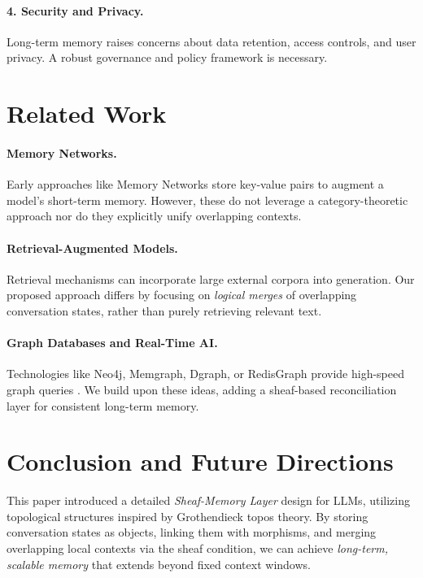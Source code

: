 \documentclass{article}
\begin{document}
\paragraph{4. Security and Privacy.}
Long-term memory raises concerns about data retention, access controls, and user privacy. A robust governance and policy framework is necessary.

\section{Related Work}
\label{sec:related_work}

\paragraph{Memory Networks.}
Early approaches like Memory Networks \citep{weston2014memory, sukhbaatar2015end} store key-value pairs to augment a model’s short-term memory. However, these do not leverage a category-theoretic approach nor do they explicitly unify overlapping contexts.

\paragraph{Retrieval-Augmented Models.}
Retrieval mechanisms \citep{lewis2020retrieval, izacard2022few} can incorporate large external corpora into generation. Our proposed approach differs by focusing on \emph{logical merges} of overlapping conversation states, rather than purely retrieving relevant text.

\paragraph{Graph Databases and Real-Time AI.}
Technologies like Neo4j, Memgraph, Dgraph, or RedisGraph provide high-speed graph queries \citep{lin2020towards}. We build upon these ideas, adding a sheaf-based reconciliation layer for consistent long-term memory.

\section{Conclusion and Future Directions}

This paper introduced a detailed \emph{Sheaf-Memory Layer} design for LLMs, utilizing topological structures inspired by Grothendieck topos theory. By storing conversation states as objects, linking them with morphisms, and merging overlapping local contexts via the sheaf condition, we can achieve \emph{long-term, scalable memory} that extends beyond fixed context windows. 
\end{document}
